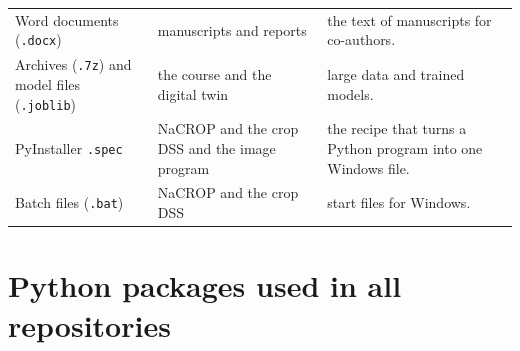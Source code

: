 \documentclass[11pt,a4paper]{article}
\begin{document}
\begin{longtable}{@{}R{3.4cm}R{4.6cm}R{7.0cm}@{}}
Word documents (\texttt{.docx}) & manuscripts and reports & the text of manuscripts for co-authors.\\
Archives (\texttt{.7z}) and model files (\texttt{.joblib}) & the course and the digital twin & large data and trained models.\\
PyInstaller \texttt{.spec} & NaCROP and the crop DSS and the image program & the recipe that turns a Python program into one Windows file.\\
Batch files (\texttt{.bat}) & NaCROP and the crop DSS & start files for Windows.\\
\bottomrule\end{longtable}

\section{Python packages used in all repositories}
\end{document}
